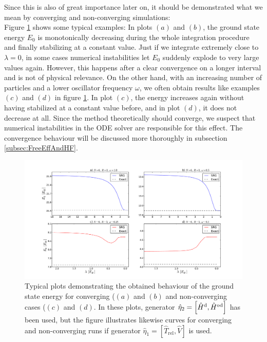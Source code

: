 Since this is also of great importance later on, it should be demonstrated what we mean by converging and non-converging simulations:\\
 Figure \ref{fig:convComp} shows some typical examples:
In plots $(a)$ and $(b)$, the ground state energy $E_0$ is monotonically decreasing during the whole integration procedure and finally stabilizing at a constant value. Just if we integrate extremely close to $\lambda=0$, in some cases numerical instabilities let $E_0$ suddenly explode to very large values again. However, this happens after a clear convergence on a longer interval and is not of physical relevance. On the other hand, with an increasing number of particles and a lower oscillator frequency $\omega$, we often obtain  results like examples $(c)$ and $(d)$ in figure \ref{fig:convComp}. In plot $(c)$, the energy increases again without having stabilized at a constant value before, and in plot $(d)$, it does not decrease at all. Since the method theoretically should converge, we suspect that numerical instabilities in the ODE solver are responsible for this effect. The  convergence behaviour will be discussed more thoroughly in subsection \ref{subsec:FreeEffAndHF}.

\begin{figure}
\begin{center}
\includegraphics[scale=0.42]{../Plots/convComp.pdf}
\caption{Typical plots demonstrating the obtained behaviour of the ground state energy for converging ($(a)$ and $(b)$ and non-converging cases ($(c)$ and $(d)$. In these plots, generator $\hat{\eta}_2 = \left[ \hat{H}^{\rm d}, \hat{H}^{\rm od} \right]$ has been used, but the figure illustrates likewise curves for converging and non-converging runs if  generator $\hat{\eta}_1 = \left[ \hat{T}_{\text{rel}}, \hat{V}\right]$ is used. }
\label{fig:convComp}
\end{center}
\end{figure}


